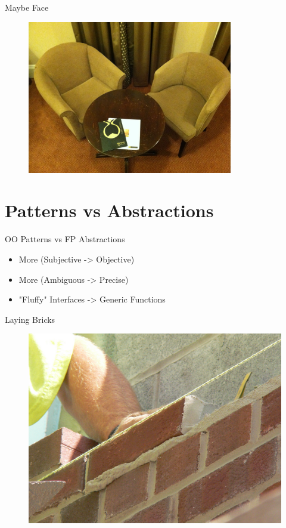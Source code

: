 \documentclass[compress]{beamer}
\begin{document}
\begin{frame}{Maybe Face}
  \begin{figure}
    \includegraphics[width=0.8\textwidth]{assets/maybeface.jpg}
  \end{figure}
\end{frame}

\section{Patterns vs Abstractions}

\begin{frame}{OO Patterns vs FP Abstractions}
  \begin{itemize}
    \item \Large{More (Subjective -> Objective)} \newline
    \item \Large{More (Ambiguous -> Precise)} \newline
    \item \Large{"Fluffy" Interfaces -> Generic Functions}
  \end{itemize}
\end{frame}

\begin{frame}{Laying Bricks}
  \begin{figure}
    \centering
    \includegraphics[width=\linewidth]{assets/layingbricks.jpg}
  \end{figure}
\end{frame}
\end{document}
